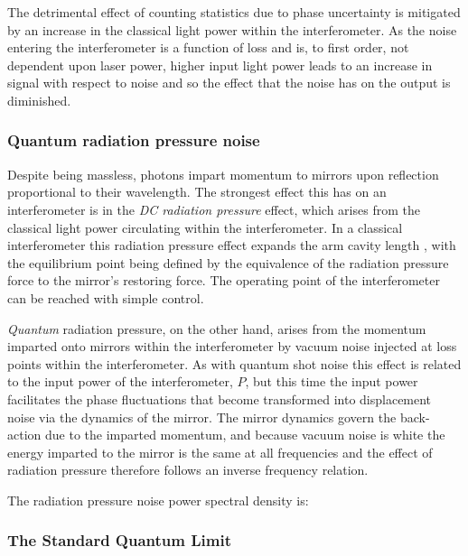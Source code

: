 The detrimental effect of counting statistics due to phase uncertainty is mitigated by an increase in the classical light power within the interferometer. As the noise entering the interferometer is a function of loss and is, to first order, not dependent upon laser power, higher input light power leads to an increase in signal with respect to noise and so the effect that the noise has on the output is diminished.

\subsubsection{Quantum radiation pressure noise}
Despite being massless, photons impart momentum to mirrors upon reflection proportional to their wavelength. The strongest effect this has on an interferometer is in the \emph{\gls{DC} radiation pressure} effect, which arises from the classical light power circulating within the interferometer. In a classical interferometer this radiation pressure effect expands the arm cavity length , with the equilibrium point being defined by the equivalence of the radiation pressure force to the mirror's restoring force. The operating point of the interferometer can be reached with simple control.

\emph{Quantum} radiation pressure, on the other hand, arises from the momentum imparted onto mirrors within the interferometer by vacuum noise injected at loss points within the interferometer. As with quantum shot noise this effect is related to the input power of the interferometer, $P$, but this time the input power facilitates the phase fluctuations that become transformed into displacement noise via the dynamics of the mirror. The mirror dynamics govern the back-action due to the imparted momentum, and because vacuum noise is white the energy imparted to the mirror is the same at all frequencies and the effect of radiation pressure therefore follows an inverse frequency relation.

The radiation pressure noise power spectral density is:


\subsubsection{\label{sec:sql}The Standard Quantum Limit}

